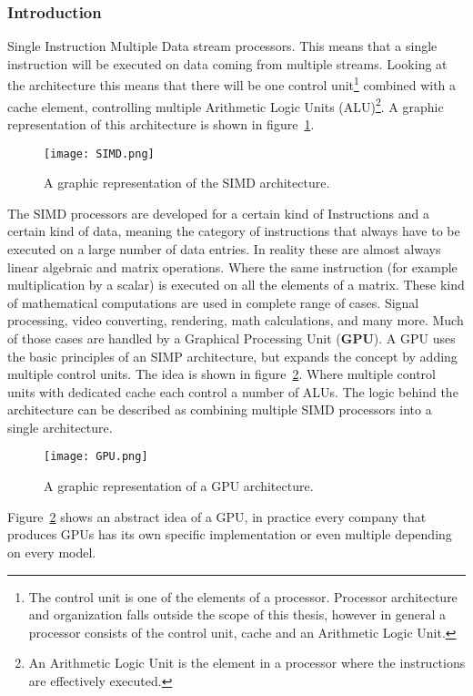 \subsubsection{Introduction}
Single Instruction Multiple Data stream processors.
This means that a single instruction will be executed on data coming from multiple streams.
Looking at the architecture this means that there will be one control unit\footnote{The control unit is one of the elements of a processor. Processor architecture and organization falls outside the scope of this thesis, however in general a processor consists of the control unit, cache and an Arithmetic Logic Unit. } combined with a cache element, controlling multiple Arithmetic Logic Units (ALU)\footnote{An Arithmetic Logic Unit is the element in a processor where the instructions are effectively executed.}.
A graphic representation of this architecture is shown in figure~\ref{fig:simd}.
\par 
\begin{figure}
	\centering
	\texttt{[image: SIMD.png]}
	\caption{A graphic representation of the SIMD architecture.}
	\label{fig:simd}
\end{figure}
The SIMD processors are developed for a certain kind of Instructions and a certain kind of data, meaning the category of instructions that always have to be executed on a large number of data entries.
In reality these are almost always linear algebraic and matrix operations.
Where the same instruction (for example multiplication by a scalar) is executed on all the elements of a matrix.
These kind of mathematical computations are used in complete range of cases. 
Signal processing, video converting, rendering, math calculations, and many more.
Much of those cases are handled by a Graphical Processing Unit (\textbf{GPU}). 
A GPU uses the basic principles of an SIMP architecture, but expands the concept by adding multiple control units.
The idea is shown in figure~\ref{fig:gpu}.
Where multiple control units with dedicated cache each control a number of ALUs.
The logic behind the architecture can be described as combining multiple SIMD processors into a single architecture.
\begin{figure}
	\centering
	\texttt{[image: GPU.png]}
	\caption{A graphic representation of a GPU architecture.}
	\label{fig:gpu}
\end{figure}
Figure~\ref{fig:gpu} shows an abstract idea of a GPU, in practice every company that produces GPUs has its own specific implementation or even multiple depending on every model.
